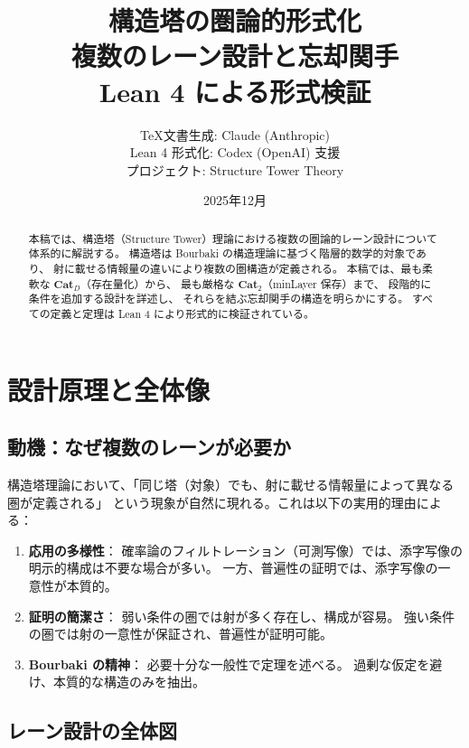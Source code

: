 \documentclass{ltjsarticle}
\title{%
  \LARGE 構造塔の圏論的形式化 \\[0.5em]
  \Large 複数のレーン設計と忘却関手 \\[1em]
  \normalsize Lean 4 による形式検証
}
\author{%
  \TeX 文書生成: Claude (Anthropic) \\
  Lean 4 形式化: Codex (OpenAI) 支援 \\[0.5em]
  \small プロジェクト: Structure Tower Theory
}
\date{2025年12月}
\theoremstyle{definition}
\newcommand{\catD}{\mathbf{Cat}_D}
\newcommand{\cattwo}{\mathbf{Cat}_2}
\begin{document}
\maketitle

\begin{abstract}
本稿では、構造塔（Structure Tower）理論における複数の圏論的レーン設計について
体系的に解説する。
構造塔は Bourbaki の構造理論に基づく階層的数学的対象であり、
射に載せる情報量の違いにより複数の圏構造が定義される。
本稿では、最も柔軟な $\catD$（存在量化）から、
最も厳格な $\cattwo$（minLayer 保存）まで、
段階的に条件を追加する設計を詳述し、
それらを結ぶ忘却関手の構造を明らかにする。
すべての定義と定理は Lean 4 により形式的に検証されている。
\end{abstract}

\tableofcontents

\newpage

\section{設計原理と全体像}

\subsection{動機：なぜ複数のレーンが必要か}

構造塔理論において、「同じ塔（対象）でも、射に載せる情報量によって異なる圏が定義される」
という現象が自然に現れる。これは以下の実用的理由による：

\begin{enumerate}[label=(\arabic*)]
  \item \textbf{応用の多様性}：
    確率論のフィルトレーション（可測写像）では、添字写像の明示的構成は不要な場合が多い。
    一方、普遍性の証明では、添字写像の一意性が本質的。
  
  \item \textbf{証明の簡潔さ}：
    弱い条件の圏では射が多く存在し、構成が容易。
    強い条件の圏では射の一意性が保証され、普遍性が証明可能。
  
  \item \textbf{Bourbaki の精神}：
    必要十分な一般性で定理を述べる。
    過剰な仮定を避け、本質的な構造のみを抽出。
\end{enumerate}

\subsection{レーン設計の全体図}
\end{document}
